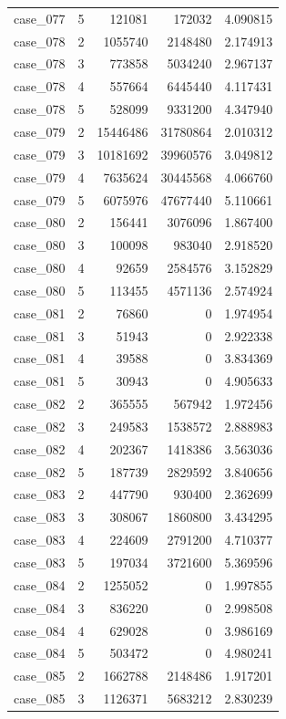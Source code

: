 \begin{longtable}{lrrrr}
case\_077 & 5 & 121081 & 172032 & 4.090815 \\
case\_078 & 2 & 1055740 & 2148480 & 2.174913 \\
case\_078 & 3 & 773858 & 5034240 & 2.967137 \\
case\_078 & 4 & 557664 & 6445440 & 4.117431 \\
case\_078 & 5 & 528099 & 9331200 & 4.347940 \\
case\_079 & 2 & 15446486 & 31780864 & 2.010312 \\
case\_079 & 3 & 10181692 & 39960576 & 3.049812 \\
case\_079 & 4 & 7635624 & 30445568 & 4.066760 \\
case\_079 & 5 & 6075976 & 47677440 & 5.110661 \\
case\_080 & 2 & 156441 & 3076096 & 1.867400 \\
case\_080 & 3 & 100098 & 983040 & 2.918520 \\
case\_080 & 4 & 92659 & 2584576 & 3.152829 \\
case\_080 & 5 & 113455 & 4571136 & 2.574924 \\
case\_081 & 2 & 76860 & 0 & 1.974954 \\
case\_081 & 3 & 51943 & 0 & 2.922338 \\
case\_081 & 4 & 39588 & 0 & 3.834369 \\
case\_081 & 5 & 30943 & 0 & 4.905633 \\
case\_082 & 2 & 365555 & 567942 & 1.972456 \\
case\_082 & 3 & 249583 & 1538572 & 2.888983 \\
case\_082 & 4 & 202367 & 1418386 & 3.563036 \\
case\_082 & 5 & 187739 & 2829592 & 3.840656 \\
case\_083 & 2 & 447790 & 930400 & 2.362699 \\
case\_083 & 3 & 308067 & 1860800 & 3.434295 \\
case\_083 & 4 & 224609 & 2791200 & 4.710377 \\
case\_083 & 5 & 197034 & 3721600 & 5.369596 \\
case\_084 & 2 & 1255052 & 0 & 1.997855 \\
case\_084 & 3 & 836220 & 0 & 2.998508 \\
case\_084 & 4 & 629028 & 0 & 3.986169 \\
case\_084 & 5 & 503472 & 0 & 4.980241 \\
case\_085 & 2 & 1662788 & 2148486 & 1.917201 \\
case\_085 & 3 & 1126371 & 5683212 & 2.830239 \\

\end{longtable}
